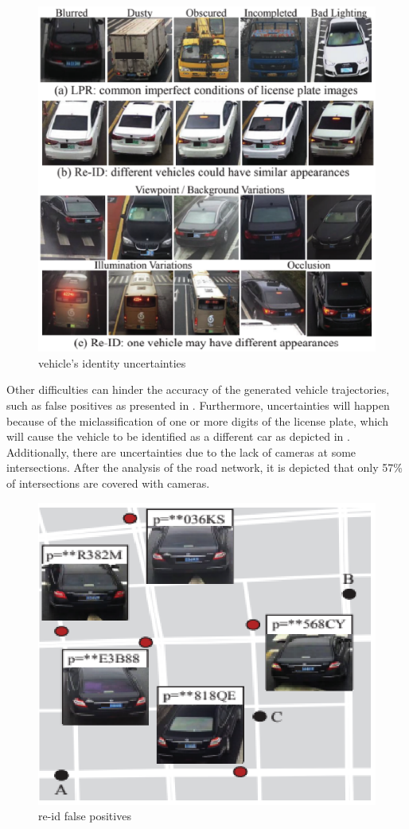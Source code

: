 \begin{figure}
\centering
  \includegraphics[width=0.9\linewidth]{figures/difficulty-in-identifying-vehicles.eps}
  \caption{vehicle's identity uncertainties \cite{tong2021large}}
  \label{fig:vehicle-identity-uncertainty}
\end{figure}

Other difficulties can hinder the accuracy of the generated vehicle trajectories, such as false positives as presented in .
Furthermore, uncertainties will happen because of the miclassification of one or more digits of the license plate, which will cause the vehicle to be identified as a different car as depicted in .
Additionally, there are uncertainties due to the lack of cameras at some intersections.
After the analysis of the road network, it is depicted that only 57\% of intersections are covered with cameras.

\begin{figure}
\centering
  \includegraphics[width=0.5\linewidth]{figures/false-positives.eps}
  \caption{\ac{re-id} false positives \cite{tong2021large}}
  \label{fig:false-positives}
\end{figure}

